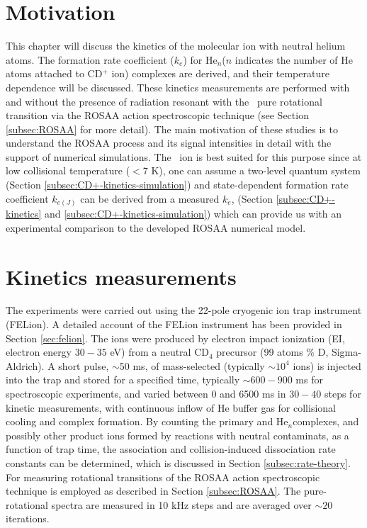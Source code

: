 \section{Motivation}
\label{sec:CD+-kinetics-motivation}

This chapter will discuss the kinetics of the \CD molecular ion with neutral
helium atoms. The formation rate coefficient ($k_e$) for He$_n$\CD ($n$
indicates the number of He atoms attached to CD$^+$ ion) complexes are derived,
and their temperature dependence will be discussed. These kinetics measurements
are performed with and without the presence of radiation resonant with the \CD\
\CDline pure rotational transition via the ROSAA action spectroscopic technique
(see Section \ref{subsec:ROSAA} for more detail). The main motivation of these
studies is to understand the ROSAA process and its signal intensities in detail
with the support of numerical simulations. The \CD\ ion is best suited
for this purpose since at low collisional temperature ($<7$ K), one can
assume a two-level quantum system (Section
\ref{subsec:CD+-kinetics-simulation}) and state-dependent formation rate
coefficient $k_{e(J)}$ can be derived from a measured $k_e$, (Section
\ref{subsec:CD+-kinetics} and \ref{subsec:CD+-kinetics-simulation}) which can
provide us with an experimental comparison to the developed ROSAA numerical
model.

\section{Kinetics measurements}
\label{sec:CD+-kinetics}
The experiments were carried out using the 22-pole cryogenic ion trap instrument (FELion). A detailed account of the FELion instrument has been provided in Section \ref{sec:felion}. The \CD ions were produced by electron impact ionization (EI, electron energy $30-35$ eV) from a neutral CD$_4$ precursor (99 atoms \% D, Sigma-Aldrich). A short pulse, $\sim$50 ms, of mass-selected \CD (typically $\sim 10^4$ ions) is injected into the trap and stored for a specified time, typically $\sim 600-900$ ms for spectroscopic experiments, and varied between 0 and 6500 ms in $30-40$ steps for kinetic measurements, with continuous inflow of He buffer gas for collisional cooling and complex formation. By counting the primary \CD and He$_n$\CD complexes, and possibly other product ions formed by reactions with neutral contaminats, as a function of trap time, the association and collision-induced dissociation rate constants can be determined, which is discussed in Section \ref{subsec:rate-theory}. For measuring rotational transitions of \CD the ROSAA action spectroscopic technique is employed as described in Section \ref{subsec:ROSAA}. The pure-rotational spectra are measured in 10 kHz steps and are averaged over $\sim 20$ iterations.

